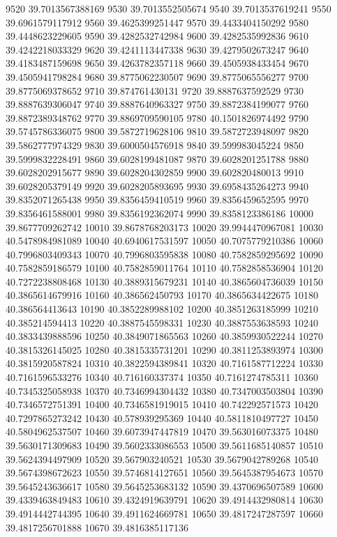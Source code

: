 {9520 39.7013567388169
9530 39.7013552505674
9540 39.7013537619241
9550 39.6961579117912
9560 39.4625399251447
9570 39.4433404150292
9580 39.4448623229605
9590 39.4282532742984
9600 39.4282535992836
9610 39.4242218033329
9620 39.4241113447338
9630 39.4279502673247
9640 39.4183487159698
9650 39.4263782357118
9660 39.4505938433454
9670 39.4505941798284
9680 39.8775062230507
9690 39.8775065556277
9700 39.8775069378652
9710 39.874761430131
9720 39.8887637592529
9730 39.8887639306047
9740 39.8887640963327
9750 39.8872384199077
9760 39.8872389348762
9770 39.8869709590105
9780 40.1501826974492
9790 39.5745786336075
9800 39.5872719628106
9810 39.5872723948097
9820 39.5862777974329
9830 39.6000504576918
9840 39.599983045224
9850 39.5999832228491
9860 39.6028199481087
9870 39.6028201251788
9880 39.6028202915677
9890 39.6028204302859
9900 39.602820480013
9910 39.6028205379149
9920 39.6028205893695
9930 39.6958435264273
9940 39.8352071265438
9950 39.8356459410519
9960 39.8356459652595
9970 39.8356461588001
9980 39.8356192362074
9990 39.8358123386186
10000 39.8677709262742
10010 39.8678768203173
10020 39.9944470967081
10030 40.5478984981089
10040 40.6940617531597
10050 40.7075779210386
10060 40.7996803409343
10070 40.7996803595838
10080 40.7582859295692
10090 40.7582859186579
10100 40.7582859011764
10110 40.7582858536904
10120 40.7272238808468
10130 40.3889315679231
10140 40.3865604736039
10150 40.3865614679916
10160 40.386562450793
10170 40.3865634422675
10180 40.386564413643
10190 40.3852289988102
10200 40.3851263185999
10210 40.385214594413
10220 40.3887545598331
10230 40.3887553638593
10240 40.3833439888596
10250 40.3849071865563
10260 40.3859930522244
10270 40.3815326145025
10280 40.3815335731201
10290 40.3811253893974
10300 40.3815920587824
10310 40.3822594389841
10320 40.7161587712224
10330 40.7161596533276
10340 40.716160337374
10350 40.7161274785311
10360 40.7345325058938
10370 40.7346994304432
10380 40.7347003503804
10390 40.7346572751391
10400 40.7346581919015
10410 40.742292571573
10420 40.7297865273242
10430 40.578939295369
10440 40.5811810497727
10450 40.5804962537507
10460 39.6073947447819
10470 39.563016073375
10480 39.5630171309683
10490 39.5602333086553
10500 39.5611685140857
10510 39.5624394497909
10520 39.567903240521
10530 39.5679042789268
10540 39.5674398672623
10550 39.5746814127651
10560 39.5645387954673
10570 39.5645243636617
10580 39.5645253683132
10590 39.4370696507589
10600 39.4339463849483
10610 39.4324919639791
10620 39.4914432980814
10630 39.4914442744395
10640 39.4911624669781
10650 39.4817247287597
10660 39.4817256701888
10670 39.4816385117136
}
